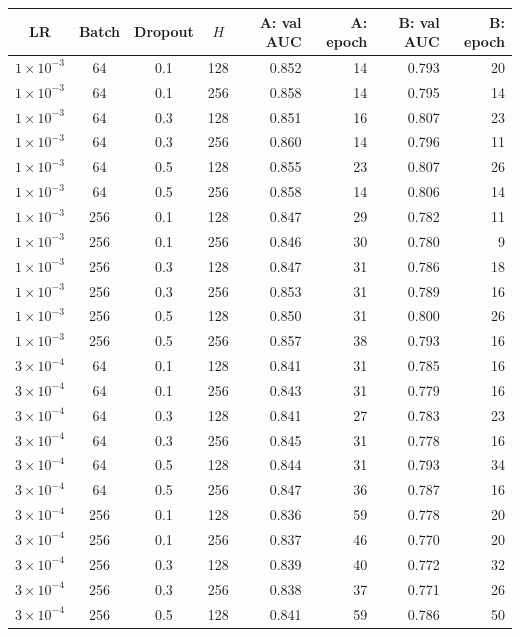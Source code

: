 \begin{table}[H]
\centering\footnotesize
\begin{tabularx}{\linewidth}{@{}c c c c r r r r@{}}
\toprule
LR & Batch & Dropout & $H$ & A: val AUC & A: epoch & B: val AUC & B: epoch\\
\midrule
$1\times10^{-3}$ & 64 & 0.1 & 128 & 0.852 & 14 & 0.793 & 20\\
$1\times10^{-3}$ & 64 & 0.1 & 256 & 0.858 & 14 & 0.795 & 14\\
$1\times10^{-3}$ & 64 & 0.3 & 128 & 0.851 & 16 & 0.807 & 23\\
$1\times10^{-3}$ & 64 & 0.3 & 256 & 0.860 & 14 & 0.796 & 11\\
$1\times10^{-3}$ & 64 & 0.5 & 128 & 0.855 & 23 & 0.807 & 26\\
$1\times10^{-3}$ & 64 & 0.5 & 256 & 0.858 & 14 & 0.806 & 14\\
$1\times10^{-3}$ & 256 & 0.1 & 128 & 0.847 & 29 & 0.782 & 11\\
$1\times10^{-3}$ & 256 & 0.1 & 256 & 0.846 & 30 & 0.780 & 9\\
$1\times10^{-3}$ & 256 & 0.3 & 128 & 0.847 & 31 & 0.786 & 18\\
$1\times10^{-3}$ & 256 & 0.3 & 256 & 0.853 & 31 & 0.789 & 16\\
$1\times10^{-3}$ & 256 & 0.5 & 128 & 0.850 & 31 & 0.800 & 26\\
$1\times10^{-3}$ & 256 & 0.5 & 256 & 0.857 & 38 & 0.793 & 16\\
$3\times10^{-4}$ & 64 & 0.1 & 128 & 0.841 & 31 & 0.785 & 16\\
$3\times10^{-4}$ & 64 & 0.1 & 256 & 0.843 & 31 & 0.779 & 16\\
$3\times10^{-4}$ & 64 & 0.3 & 128 & 0.841 & 27 & 0.783 & 23\\
$3\times10^{-4}$ & 64 & 0.3 & 256 & 0.845 & 31 & 0.778 & 16\\
$3\times10^{-4}$ & 64 & 0.5 & 128 & 0.844 & 31 & 0.793 & 34\\
$3\times10^{-4}$ & 64 & 0.5 & 256 & 0.847 & 36 & 0.787 & 16\\
$3\times10^{-4}$ & 256 & 0.1 & 128 & 0.836 & 59 & 0.778 & 20\\
$3\times10^{-4}$ & 256 & 0.1 & 256 & 0.837 & 46 & 0.770 & 20\\
$3\times10^{-4}$ & 256 & 0.3 & 128 & 0.839 & 40 & 0.772 & 32\\
$3\times10^{-4}$ & 256 & 0.3 & 256 & 0.838 & 37 & 0.771 & 26\\
$3\times10^{-4}$ & 256 & 0.5 & 128 & 0.841 & 59 & 0.786 & 50\\

\end{tabularx}
\end{table}
